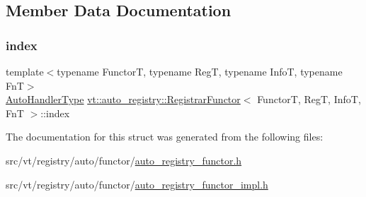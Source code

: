 \subsection{Member Data Documentation}
\mbox{\label{structvt_1_1auto__registry_1_1_registrar_functor_a02d2f38340b9b6846ac3ec7b77fdcd4f}} 
\subsubsection{\texorpdfstring{index}{index}}
{\footnotesize\ttfamily template$<$typename FunctorT, typename RegT, typename InfoT, typename FnT$>$ \\
\hyperlink{namespacevt_1_1auto__registry_ae295e18699146815bb7d7674594d95d7}{Auto\+Handler\+Type} \hyperlink{structvt_1_1auto__registry_1_1_registrar_functor}{vt\+::auto\+\_\+registry\+::\+Registrar\+Functor}$<$ FunctorT, RegT, InfoT, FnT $>$\+::index}



The documentation for this struct was generated from the following files\+:\begin{DoxyCompactItemize}
\item 
src/vt/registry/auto/functor/\hyperlink{auto__registry__functor_8h}{auto\+\_\+registry\+\_\+functor.\+h}\item 
src/vt/registry/auto/functor/\hyperlink{auto__registry__functor__impl_8h}{auto\+\_\+registry\+\_\+functor\+\_\+impl.\+h}\end{DoxyCompactItemize}
